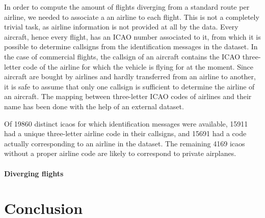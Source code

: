 \documentclass{vldb}
\begin{document}
In order to compute the amount of flights diverging from a standard route per
airline, we needed to associate a an airline to each flight. This is not a
completely trivial task, as airline information is not provided at all by the
data. Every aircraft, hence every flight, has an ICAO number associated to it,
from which it is possible to determine callsigns from the identification
messages in the dataset. In the case of commercial flights, the callsign of an
aircraft contains the ICAO three-letter code of the airline for which the
vehicle is flying for at the moment. Since aircraft are bought by airlines and
hardly transferred from an airline to another, it is safe to assume that only
one callsign is sufficient to determine the airline of an aircraft.
The mapping between three-letter ICAO codes of airlines and their name has been
done with the help of an external dataset.

Of 19860 distinct icaos for which identification messages were available, 15911
had a unique three-letter airline code in their callsigns, and 15691 had a code
actually corresponding to an airline in the dataset. The remaining 4169
icaos without a proper airline code are likely to correspond to private airplanes.

\paragraph{Diverging flights}


\section{Conclusion}
\end{document}
